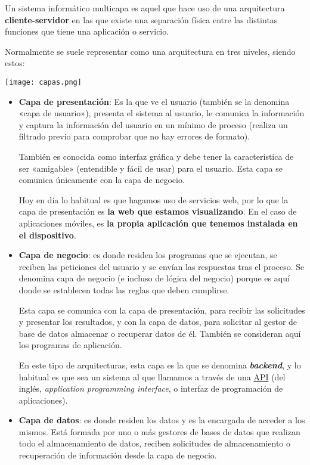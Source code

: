 Un sistema informático multicapa es aquel que hace uso de una arquitectura \textbf{cliente-servidor} en las que existe una separación física entre las distintas funciones que tiene una aplicación o servicio.

Normalmente se suele representar como una arquitectura en tres niveles, siendo estos:

\begin{center}
    \texttt{[image: capas.png]}
\end{center}

\begin{itemize}
    \item \textbf{Capa de presentación}: Es la que ve el usuario (también se la denomina «capa de usuario»), presenta el sistema al usuario, le comunica la información y captura la información del usuario en un mínimo de proceso (realiza un filtrado previo para comprobar que no hay errores de formato).

    También es conocida como interfaz gráfica y debe tener la característica de ser «amigable» (entendible y fácil de usar) para el usuario. Esta capa se comunica únicamente con la capa de negocio.

    Hoy en día lo habitual es que hagamos uso de servicios web, por lo que la capa de presentación es \textbf{la web que estamos visualizando}. En el caso de aplicaciones móviles, es \textbf{la propia aplicación que tenemos instalada en el dispositivo}.

    \item \textbf{Capa de negocio}: es donde residen los programas que se ejecutan, se reciben las peticiones del usuario y se envían las respuestas tras el proceso. Se denomina capa de negocio (e incluso de lógica del negocio) porque es aquí donde se establecen todas las reglas que deben cumplirse.

    Esta capa se comunica con la capa de presentación, para recibir las solicitudes y presentar los resultados, y con la capa de datos, para solicitar al gestor de base de datos almacenar o recuperar datos de él. También se consideran aquí los programas de aplicación.

    En este tipo de arquitecturas, esta capa es la que se denomina \textbf{\textit{backend}}, y lo habitual es que sea un sistema al que llamamos a través de una \href{https://es.wikipedia.org/wiki/API}{API} (del inglés, \textit{application programming interface}, o interfaz de programación de aplicaciones).

    \item \textbf{Capa de datos}: es donde residen los datos y es la encargada de acceder a los mismos. Está formada por uno o más gestores de bases de datos que realizan todo el almacenamiento de datos, reciben solicitudes de almacenamiento o recuperación de información desde la capa de negocio.
\end{itemize}


